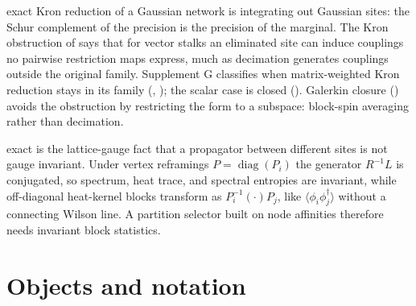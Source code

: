 \begin{analogy}{exact}
Kron reduction of a Gaussian network is integrating out Gaussian sites: the Schur complement of the
precision is the precision of the marginal. The Kron obstruction of \citet{HansenGhrist2019} says that
for vector stalks an eliminated site can induce couplings no pairwise restriction maps express, much as
decimation generates couplings outside the original family. Supplement G classifies when matrix-weighted
Kron reduction stays in its family (, );
the scalar case is closed (). Galerkin closure
() avoids the obstruction by restricting the form to a subspace:
block-spin averaging rather than decimation.
\end{analogy}

\begin{analogy}{exact}
 is the lattice-gauge fact that a propagator between different sites is not
gauge invariant. Under vertex reframings $P=\operatorname{diag}(P_i)$ the generator $R^{-1}L$ is
conjugated, so spectrum, heat trace, and spectral entropies are invariant, while off-diagonal heat-kernel
blocks transform as $P_i^{-1}(\cdot)P_j$, like $\langle\phi_i\phi_j^\dagger\rangle$ without a connecting
Wilson line. A partition selector built on node affinities therefore needs invariant block statistics.
\end{analogy}

\section{Objects and notation}
\label{comp:ch15-notation}

